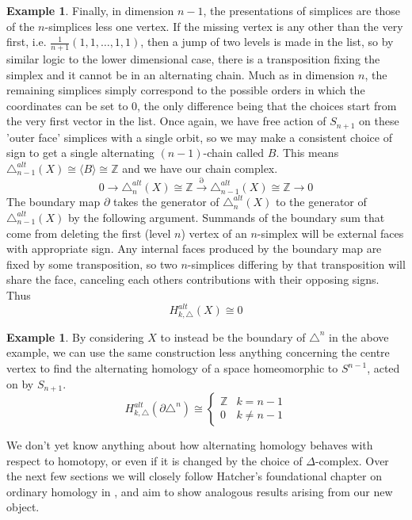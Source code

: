 \documentclass[11pt,a4paper,twoside]{article}
\theoremstyle{plain}
\theoremstyle{definition}
\theoremstyle{definition}
\theoremstyle{definition}
\theoremstyle{definition}
\newtheorem{example}[thm]{Example}
\theoremstyle{definition}
\begin{document}
\begin{example}
Finally, in dimension $n-1$, the presentations of simplices are those of the $n$-simplices less one vertex. If the missing vertex is any other than the very first, i.e. $\frac1{n+1}(1,1,\dots,1,1)$, then a jump of two levels is made in the list, so by similar logic to the lower dimensional case, there is a transposition fixing the simplex and it cannot be in an alternating chain. Much as in dimension $n$, the remaining simplices simply correspond to the possible orders in which the coordinates can be set to $0$, the only difference being that the choices start from the very first vector in the list. Once again, we have free action of $S_{n+1}$ on these 'outer face' simplices with a single orbit, so we may make a consistent choice of sign to get a single alternating $(n\!-\!1)$-chain called $B$. This means $\triangle_{n-1}^{alt}(X)\cong\langle B\rangle\cong\mathbb{Z}$ and we have our chain complex.
$$0\longrightarrow \triangle_n^{alt}(X)\cong\mathbb{Z}\overset{\partial}{\longrightarrow}\triangle_{n\!-\!1}^{alt}(X)\cong\mathbb{Z}\longrightarrow0$$
The boundary map $\partial$ takes the generator of $\triangle_n^{alt}(X)$ to the generator of $\triangle_{n\!-\!1}^{alt}(X)$ by the following argument. Summands of the boundary sum that come from deleting the first (level $n$) vertex of an $n$-simplex will be external faces with appropriate sign. Any internal faces produced by the boundary map are fixed by some transposition, so two $n$-simplices differing by that transposition will share the face, canceling each others contributions with their opposing signs. Thus
$$H_{k,\triangle}^{alt}(X)\cong 0$$
\end{example}
\begin{example}
By considering $X$ to instead be the boundary of $\triangle^n$ in the above example, we can use the same construction less anything concerning the centre vertex to find the alternating homology of a space homeomorphic to $S^{n-1}$, acted on by $S_{n+1}$.
$$H_{k,\triangle}^{alt}(\partial\triangle^n)\cong \begin{cases} \mathbb{Z} & k=n-1 \\ 0 & k\neq n-1\end{cases}$$
\end{example}
We don't yet know anything about how alternating homology behaves with respect to homotopy, or even if it is changed by the choice of $\Delta$-complex. Over the next few sections we will closely follow Hatcher's foundational chapter on ordinary homology in \cite{algebraictopology}, and aim to show analogous results arising from our new object.
\end{document}
